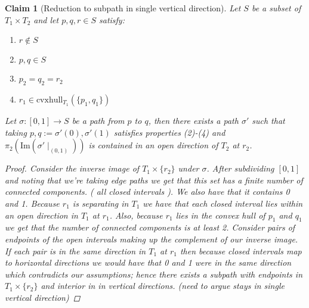 \documentclass{article}
\theoremstyle{mystyle}
\newtheorem*{claim*}{Claim}
\theoremstyle{remark}
\begin{document}
\begin{claim*}
    [Reduction to subpath in single vertical direction]
    \label{lem:verticalsubpath} 
    Let \(S\) be a subset of \(T_{1} \times T_{2}\) and let \(p,q,r \in S\) satisfy: 
    \begin{enumerate}
        \item \(r \not\in S\) 
        \item \(p,q \in S\) 
        \item \(p_{2} = q_{2} = r_{2}\) 
        \item \(r_{1} \in \text{cvxhull}_{T_{1}} (\{p_{1}, q_{1} \} )\) 
    \end{enumerate}
    Let \(\sigma : [0,1] \to S\) be a path from \(p\) to \(q\), then there exists a path \(\sigma '\) such that taking \(p,q:= \sigma '(0), \sigma '(1)\) satisfies properties (2)-(4) and \(\pi_{2} (\text{Im}( \sigma '\mid_{(0,1)} ))\) is contained in an open direction of \(T_{2}\) at \(r_{2}\).
    \begin{proof}
        Consider the inverse image of \(T_{1} \times \{r_{2}\} \) under \(\sigma\). After subdividing \([0,1]\) and noting that we're taking edge paths we get that this set has a finite number of connected components. ( all closed intervals ). We also have that it contains 0 and 1. Because \(r_{1}\) is separating in \(T_{1}\) we have that each closed interval lies within an open direction in \(T_{1}\) at \(r_{1}\). Also, because \(r_{1}\) lies in the convex hull of \(p_{1}\) and \(q_{1}\) we get that the number of connected components is at least 2. Consider pairs of endpoints of the open intervals making up the complement of our inverse image. If each pair is in the same direction in \(T_{1}\) at \(r_{1}\) then because closed intervals map to horizontal directions we would have that 0 and 1 were in the same direction which contradicts our assumptions; hence there exists a subpath with endpoints in \(T_{1} \times \{r_{2}\}\) and interior in in vertical directions. (need to argue stays in single vertical direction)
    \end{proof}
\end{claim*}
\end{document}
